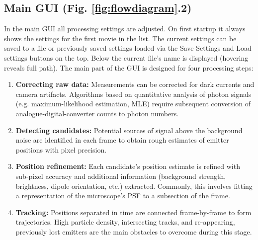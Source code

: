 \documentclass[11pt,onside]{report}
\numberwithin{equation}{chapter}
\begin{document}
\subsection{Main GUI (Fig. \ref{fig:flowdiagram}.2)}
In the main GUI all processing settings are adjusted. On first startup it always shows the settings for the first movie in the list. The current settings can be saved to a file or previously saved settings loaded via the \textsf{Save Settings} and \textsf{Load settings} buttons on the top. Below the current file's name is displayed (hovering reveals full path). The main part of the GUI is designed for four processing steps:
\begin{enumerate}
 \item \textbf{Correcting raw data:} Measurements can be corrected for dark currents and camera artifacts. Algorithms based on quantitative analysis of photon signals (e.g. maximum-likelihood estimation, MLE) require subsequent conversion of analogue-digital-converter counts to photon numbers.
 \item \textbf{Detecting candidates:} Potential sources of signal above the background noise are identified in each frame to obtain rough estimates of emitter positions with pixel precision. %
  \item \textbf{Position refinement:} Each candidate's position estimate is refined with sub-pixel accuracy and additional information (background strength, brightness, dipole orientation, etc.) extracted. Commonly, this involves fitting a representation of the microscope's PSF to a subsection of the frame.
    \item \textbf{Tracking:} Positions separated in time are connected frame-by-frame to form trajectories. High particle density, intersecting tracks, and re-appearing, previously lost emitters are the main obstacles to overcome during this stage.
\end{enumerate}
\end{document}
